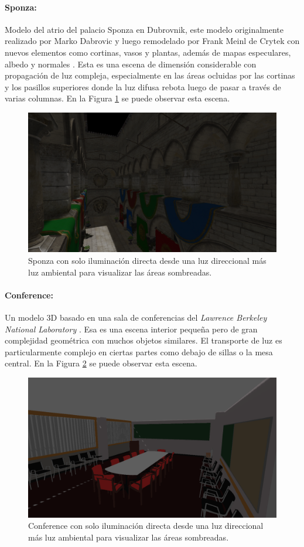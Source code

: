 \paragraph{Sponza:} Modelo del atrio del palacio Sponza en Dubrovnik, este modelo originalmente realizado por Marko Dabrovic y luego remodelado por Frank Meinl de Crytek con nuevos elementos como cortinas, vasos y plantas, además de mapas especulares, albedo y normales \cite{sponza_model}. Esta es una escena de dimensión considerable con propagación de luz compleja, especialmente en las áreas ocluidas por las cortinas y los pasillos superiores donde la luz difusa rebota luego de pasar a través de varias columnas. En la Figura \ref{fig:crytek_sponza} se puede observar esta escena.

\begin{figure}[H]
	\centering
	\includegraphics[width=0.65\linewidth]{media/scenes/sponza.png}
	\caption{Sponza con solo iluminación directa desde una luz direccional más luz ambiental para visualizar las áreas sombreadas.}
	\label{fig:crytek_sponza}
\end{figure}

\paragraph{Conference:} Un modelo 3D basado en una sala de conferencias del \emph{Lawrence Berkeley National Laboratory} \cite{conference_model}. Esa es una escena interior pequeña pero de gran complejidad geométrica con muchos objetos similares. El transporte de luz es particularmente complejo en ciertas partes como debajo de sillas o la mesa central. En la Figura \ref{fig:conference} se puede observar esta escena.

\begin{figure}[H]
	\centering
	\includegraphics[width=0.65\linewidth]{media/scenes/conference.png}
	\caption{Conference con solo iluminación directa desde una luz direccional más luz ambiental para visualizar las áreas sombreadas.}
	\label{fig:conference}
\end{figure}

